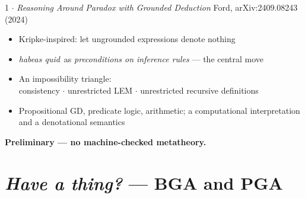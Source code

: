\documentclass[aspectratio=169,11pt]{beamer}
\newcommand{\hq}{\textit{habeas quid}}
\newcommand{\amber}[1]{{\color{gap}\textbf{#1}}}
\begin{document}
\begin{frame}{1 $\cdot$ \emph{Reasoning Around Paradox with Grounded Deduction}}
  {\small Ford, arXiv:2409.08243 (2024)}
  \vfill
  \begin{itemize}\itemsep0.7em
    \item Kripke-inspired: let ungrounded expressions denote nothing
    \item \hq\ as \emph{preconditions on inference rules} --- the central move
    \item An impossibility triangle:\\
          \small consistency $\cdot$ unrestricted LEM $\cdot$ unrestricted recursive definitions
    \item Propositional GD, predicate logic, arithmetic; a computational
          interpretation and a denotational semantics
  \end{itemize}
  \vfill
  \begin{center}\small \amber{Preliminary --- no machine-checked metatheory.}\end{center}
\end{frame}

\section{\emph{Have a thing?} --- BGA and PGA}
\end{document}
